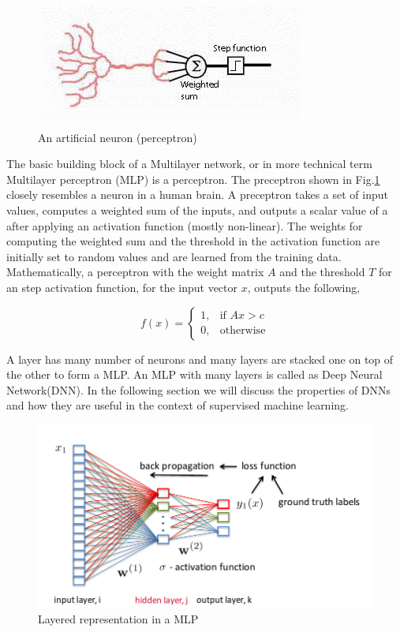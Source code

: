 \documentclass[a4paper]{article}
\begin{document}
\begin{figure}
  \includegraphics[width=.99\linewidth]{img/artificial.jpg}
  \caption{ An artificial neuron (perceptron)}
  \label{fig:ann}
\end{figure}

The  basic  building block of a  Multilayer network, or  in more technical  term
Multilayer  perceptron  (MLP)  is a  perceptron.  The  preceptron shown in Fig.\ref{fig:ann}
closely resembles a neuron in a human brain. A preceptron takes
a set of input  values,  computes a weighted sum of the  inputs, and outputs  a
scalar value of a after applying an activation function (mostly non-linear). The
weights for  computing  the  weighted  sum and  the threshold  in the activation
function  are initially  set to random values and are learned  from the training
data. Mathematically, a perceptron with the  weight matrix $A$ and the threshold
$T$  for  an  step activation function, for the  input vector $x$,  outputs  the
following,


\[
  f(x)=
  \begin{cases}
    1, & \text{if }  A x > c \\
    0, & \text{otherwise}
  \end{cases}
\]


A layer has many number of neurons and many layers are stacked one on top of the
other to form a MLP. An  MLP  with  many layers is  called  as Deep  Neural
Network(DNN). In the following section we will discuss  the properties  of  DNNs
and how they are useful in the context of supervised machine learning.





\begin{figure}
  \includegraphics[width=.99\linewidth]{img/mlp.png}
  \caption{Layered representation in a MLP}
  \label{fig:mlp}
\end{figure}
\end{document}

